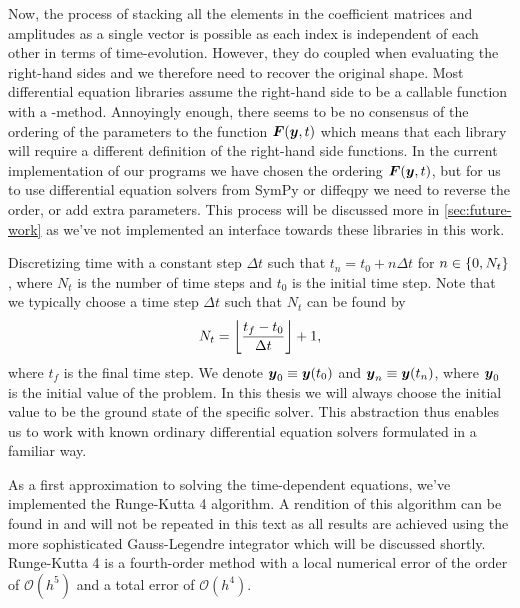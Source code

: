             Now, the process of stacking all the elements in the coefficient
            matrices and amplitudes as a single vector is possible as each index
            is independent of each other in terms of time-evolution.
            However, they do coupled when evaluating the right-hand sides and we
            therefore need to recover the original shape.
            Most differential equation libraries \cite{sympy} \cite{julia-diff}
            assume the right-hand side to be a callable function with a
            -method.
            Annoyingly enough, there seems to be no consensus of the ordering of
            the parameters to the function $\boldsymbol{F}(\boldsymbol{y}, t)$ which means
            that each library will require a different definition of the
            right-hand side functions.
            In the current implementation of our programs we have chosen the
            ordering $\boldsymbol{F}(\boldsymbol{y}, t)$, but for us to use differential
            equation solvers from SymPy \cite{sympy} or diffeqpy
            \cite{julia-diff} we need to reverse the order, or add extra
            parameters.
            This process will be discussed more in \autoref{sec:future-work} as
            we've not implemented an interface towards these libraries in this
            work.

            Discretizing time with a constant step $\Delta t$ such that $t_n
            = t_0 + n \Delta t$ for $n \in \left\{ 0, N_t \right\}$, where $N_t$ is the number of
            time steps and $t_0$ is the initial time step.
            Note that we typically choose a time step $\Delta t$ such that $N_t$ can be
            found by
            \begin{align}
                N_t = \left\lfloor \frac{t_f - t_0}{\Delta t} \right\rfloor + 1,
            \end{align}
            where $t_f$ is the final time step.
            We denote $\boldsymbol{y}_0 \equiv \boldsymbol{y}(t_0)$ and $\boldsymbol{y}_n \equiv
            \boldsymbol{y}(t_n)$, where $\boldsymbol{y}_0$ is the initial value of the
            problem.
            In this thesis we will always choose the initial value to be the
            ground state of the specific solver.
            This abstraction thus enables us to work with known ordinary
            differential equation solvers formulated in a familiar way.

            As a first approximation to solving the time-dependent equations,
            we've implemented the Runge-Kutta 4 algorithm.
            A rendition of this algorithm can be found in
             \cite{morken2017notes} and will not be
            repeated in this text as all results are achieved using the more
            sophisticated Gauss-Legendre integrator which will be discussed
            shortly.
            Runge-Kutta 4 is a fourth-order method with a local numerical error
            of the order of $\mathcal{O}(h^5)$ and a total error of
            $\mathcal{O}(h^4)$.


